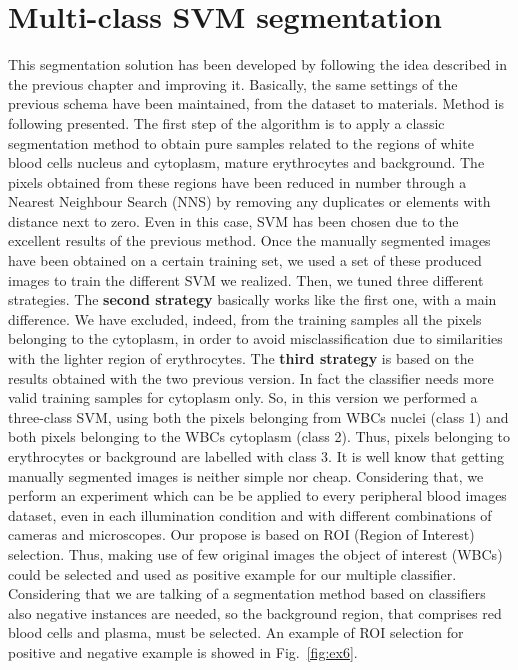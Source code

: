 \documentclass[final,a4paper,12pt,english]{UnicaPhdThesis3}
\begin{document}
\section{Multi-class SVM segmentation} \label{caip2015}  %
This segmentation solution has been developed by following the idea described in the previous chapter and improving it.
Basically, the same settings of the previous schema have been maintained, from the dataset to materials. Method is following presented.
The first step of the algorithm is to apply a classic segmentation method to obtain pure samples related to the regions of white blood cells nucleus and cytoplasm, mature erythrocytes and background. The pixels obtained from these regions have been reduced in number through a Nearest Neighbour  Search (NNS) by removing any duplicates or elements with distance next to zero. Even in this case, SVM has been chosen due to the excellent results of the previous method. Once the manually segmented images have been obtained on a certain training set, we used a set of these produced images to train the different SVM we realized. Then, we tuned three different strategies. 
The \textbf{second strategy} basically works like the first one, with a main difference. We have excluded, indeed, from the training samples all the pixels belonging to the cytoplasm, in order to avoid misclassification due to similarities with the lighter region of erythrocytes. 
The \textbf{third strategy} is based on the results obtained with the two previous version. In fact the classifier needs more valid training samples for cytoplasm only. So, in this version we performed a three-class SVM, using both the pixels belonging from WBCs nuclei (class 1) and both pixels belonging to the WBCs cytoplasm (class 2). Thus, pixels belonging to erythrocytes or background are labelled with class 3. 
It is well know that getting manually segmented images is neither simple nor cheap. Considering that, we perform an experiment which can be be applied to every peripheral blood images dataset, even in each illumination condition and with different combinations  of cameras and microscopes. 
Our propose is based on ROI (Region of Interest) selection. Thus, making use of few original images the object of interest (WBCs) could be selected and used as positive example for our multiple classifier. Considering that we are talking of a segmentation method based on classifiers also negative instances are needed, so the background region, that comprises red blood cells and plasma, must be selected. An example of ROI selection for positive and negative example is showed in Fig.~\ref{fig:ex6}.
\end{document}
